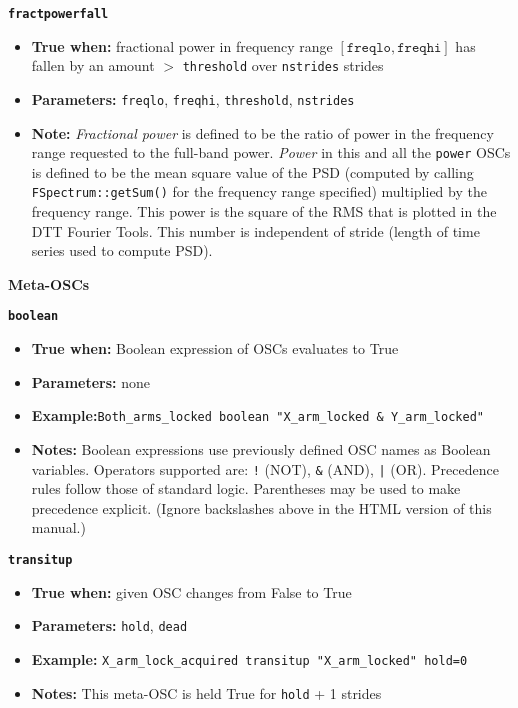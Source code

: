 \documentclass[11pt]{article}
\begin{document}
{\large\texttt{\textbf{fractpowerfall}}}

\begin{itemize}
\item \textbf{True when:} fractional power in frequency range
  $[\mathtt{freqlo}, \mathtt{freqhi}]$ has fallen by an amount $>$
  \texttt{threshold} over \texttt{nstrides} strides
\item \textbf{Parameters:} \texttt{freqlo}, \texttt{freqhi},
  \texttt{threshold}, \texttt{nstrides}
\item \textbf{Note:} \textit{Fractional power} is defined to be the
  ratio of power in the frequency range requested to the full-band
  power.  \textit{Power} in this and all the \texttt{power}
  OSCs is defined to be the mean square value of the PSD
 (computed by calling \texttt{FSpectrum::getSum()} for the
  frequency range specified) multiplied by the frequency range.  This
  power is the square of the RMS that is plotted in the DTT Fourier
  Tools. This number is independent of stride (length of time series
  used to compute PSD). 
\end{itemize}

\begin{center}
  \textbf{Meta-OSCs}
\end{center}

{\large\texttt{\textbf{boolean}}}

\begin{itemize}
\item \textbf{True when:} Boolean expression of OSCs evaluates to True
\item \textbf{Parameters:} none
\item \textbf{Example:}\texttt{Both\_arms\_locked  boolean "X\_arm\_locked
    \& Y\_arm\_locked"}
\item \textbf{Notes:} Boolean expressions use previously defined OSC
  names as Boolean variables.  Operators supported are: \texttt{!}
  (NOT), \texttt{\&} (AND), \texttt{|} (OR).  Precedence rules follow
  those of standard logic. Parentheses may be used to make precedence
  explicit. (Ignore backslashes above in the HTML version of this
  manual.)
\end{itemize}

{\large\texttt{\textbf{transitup}}}

\begin{itemize}
\item \textbf{True when:} given OSC changes from False to True
\item \textbf{Parameters:} \texttt{hold}, \texttt{dead}
\item \textbf{Example:} \texttt{X\_arm\_lock\_acquired  transitup
    "X\_arm\_locked" hold=0}
\item \textbf{Notes:} This meta-OSC is held True for \texttt{hold} + 1 strides
\end{itemize}
\end{document}
